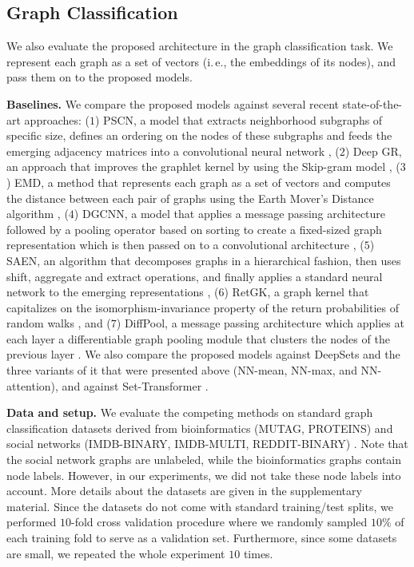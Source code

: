 \documentclass[twoside]{article}
\newcommand{\ie}{i.\,e., }
\begin{document}
\subsection{Graph Classification}
We also evaluate the proposed architecture in the graph classification task.
We represent each graph as a set of vectors (\ie the embeddings of its nodes), and pass them on to the proposed models.

\noindent\textbf{Baselines.}
We compare the proposed models against several recent state-of-the-art approaches: ($1$) PSCN, a model that extracts neighborhood subgraphs of specific size, defines an ordering on the nodes of these subgraphs and feeds the emerging adjacency matrices into a convolutional neural network \citep{niepert2016learning}, ($2$) Deep GR, an approach that improves the graphlet kernel by using the Skip-gram model \citep{yanardag2015deep}, ($3$) EMD, a method that represents each graph as a set of vectors and computes the distance between each pair of graphs using the Earth Mover's Distance algorithm \citep{nikolentzos2017matching}, ($4$) DGCNN, a model that applies a message passing architecture followed by a pooling operator based on sorting to create a fixed-sized graph representation which is then passed on to a convolutional architecture \citep{zhang2018end}, ($5$) SAEN, an algorithm that decomposes graphs in a hierarchical fashion, then uses shift, aggregate and extract operations, and finally applies a standard neural network to the emerging representations \citep{orsini2018shift}, ($6$) RetGK, a graph kernel that capitalizes on the isomorphism-invariance property of the return probabilities of random walks \citep{zhang2018retgk}, and ($7$) DiffPool, a message passing architecture which applies at each layer a differentiable graph pooling module that clusters the nodes of the previous layer \citep{ying2018hierarchical}.
We also compare the proposed models against DeepSets \citep{zaheer2017deep} and the three variants of it that were presented above (NN-mean, NN-max, and NN-attention), and against Set-Transformer \citep{lee2019set}.

\noindent\textbf{Data and setup.}
We evaluate the competing methods on standard graph classification datasets derived from bioinformatics (MUTAG, PROTEINS) and social networks (IMDB-BINARY, IMDB-MULTI, REDDIT-BINARY) \citep{KKMMN2016}.
Note that the social network graphs are unlabeled, while the bioinformatics graphs contain node labels.
However, in our experiments, we did not take these node labels into account.
More details about the datasets are given in the supplementary material.
Since the datasets do not come with standard training/test splits, we performed $10$-fold cross validation procedure where we randomly sampled $10\%$ of each training fold to serve as a validation set.
Furthermore, since some datasets are small, we repeated the whole experiment $10$ times.
\end{document}
